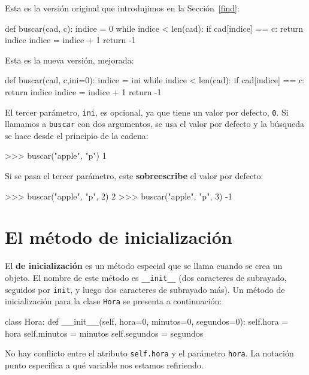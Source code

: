 Esta es la versión original que introdujimos en la Sección~\ref{find}:

\pagebreak{}

\begin{pythoncode}
def buscar(cad, c):
  indice = 0
  while indice < len(cad):
    if cad[indice] == c:
      return indice
    indice = indice + 1
  return -1
\end{pythoncode}
 Esta es la nueva versión, mejorada:
\begin{pythoncode}
def buscar(cad, c,ini=0):
  indice = ini
  while indice < len(cad):
    if cad[indice] == c:
      return indice
    indice = indice + 1
  return -1
\end{pythoncode}

El tercer parámetro, \texttt{ini}, es opcional, ya que tiene un valor
por defecto, \texttt{0}. Si llamamos a \texttt{buscar} con dos argumentos,
se usa el valor por defecto y la búsqueda se hace desde el principio
de la cadena:
\begin{pythoncode}
>>> buscar("apple", "p")
1
\end{pythoncode}

Si se pasa el tercer parámetro, este \textbf{sobreescribe} el valor
por defecto:
\begin{pyconcode}
>>> buscar("apple", "p", 2)
2
>>> buscar("apple", "p", 3)
-1
\end{pyconcode}

\section{El método de inicialización}

 

El \textbf{de inicialización} es un método especial que se llama cuando
se crea un objeto. El nombre de este método es \texttt{\_\_init\_\_}
(dos caracteres de subrayado, seguidos por \texttt{init}, y luego
dos caracteres de subrayado más). Un método de inicialización para
la clase \texttt{Hora} se presenta a continuación:
\begin{pythoncode}
class Hora:
  def __init__(self, hora=0, minutos=0, segundos=0):
    self.hora = hora
    self.minutos = minutos
    self.segundos = segundos
\end{pythoncode}

No hay conflicto entre el atributo \texttt{self.hora} y el parámetro
\texttt{hora}. La notación punto especifica a qué variable nos estamos
refiriendo.


